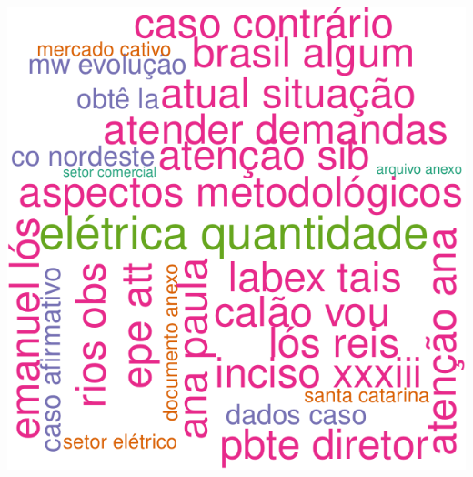 \documentclass[]{article}
\begin{document}
\includegraphics{markdown_v30_files/figure-latex/wordcloud_bigram_DIR05_semstopwords-1.pdf}
\end{document}
